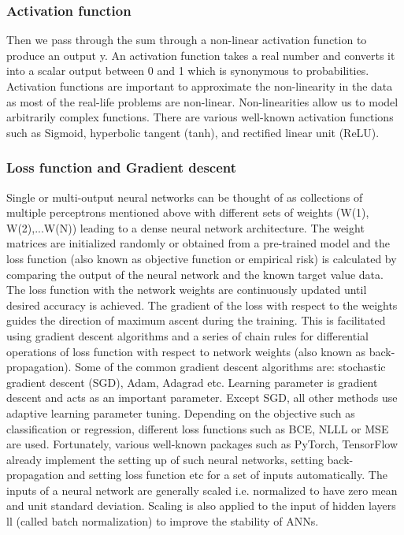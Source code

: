 \documentclass[pdflatex,sn-mathphys]{sn-jnl}%
\theoremstyle{thmstyleone}%
\theoremstyle{thmstyletwo}%
\theoremstyle{thmstylethree}%
\begin{document}
\subsubsection{Activation function}

Then we pass through the sum through a non-linear activation function to produce an output y. An activation function takes a real number and converts it into a scalar output between 0 and 1 which is synonymous to probabilities. Activation functions are important to approximate the non-linearity in the data as most of the real-life problems are non-linear. Non-linearities allow us to model arbitrarily complex functions. There are various well-known activation functions such as Sigmoid, hyperbolic tangent (tanh), and rectified linear unit (ReLU).


\subsubsection{Loss function and Gradient descent}
Single or multi-output neural networks can be thought of as collections of multiple perceptrons mentioned above with different sets of weights (W(1), W(2),...W(N)) leading to a dense neural network architecture. 
The weight matrices are initialized randomly or obtained from a pre-trained model and the loss function (also known as objective function or empirical risk) is calculated by comparing the output of the neural network and the known target value data. The loss function with the network weights are continuously updated until desired accuracy is achieved. The gradient of the loss with respect to the weights guides the direction of maximum ascent during the training. This is facilitated using gradient descent algorithms and a series of chain rules for differential operations of loss function with respect to network weights (also known as back-propagation). Some of the common gradient descent algorithms are: stochastic gradient descent (SGD), Adam, Adagrad etc.   Learning parameter is gradient descent and acts as an important parameter. Except SGD, all other methods use adaptive learning parameter tuning. Depending on the objective such as classification or regression, different loss functions such as BCE, NLLL or MSE are used. Fortunately, various well-known packages such as PyTorch, TensorFlow already implement the setting up of such neural networks, setting back-propagation and setting loss function etc for a set of inputs automatically.
The inputs of a neural network are generally scaled i.e. normalized to have zero mean and unit standard deviation. Scaling is also applied to the input of hidden layers ll (called batch normalization) to improve the stability of ANNs. 
\end{document}

